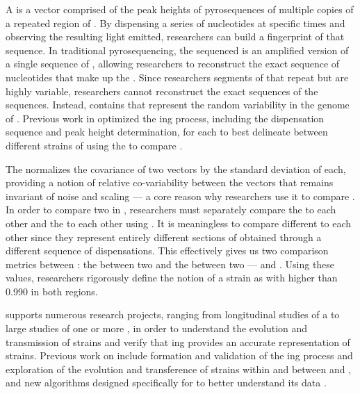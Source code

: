 A \pyro{} is a vector comprised of the peak heights of pyrosequences of multiple copies of a repeated region of \dna{}.
By dispensing a series of nucleotides at specific times and observing the resulting light emitted, \cplop{} researchers can build a fingerprint of that \dna{} sequence.
In traditional pyrosequencing, the \dna{} sequenced is an amplified version of a single sequence of \dna{}, allowing researchers to reconstruct the exact sequence of nucleotides that make up the \dna{}.
Since \cplop{} researchers \pyro{} segments of \dna{} that repeat but are highly variable, researchers cannot reconstruct the exact sequences of the \itsshort{} sequences.
Instead, \cplop{} contains \pyros{} that represent the random variability in the genome of \ecoli{} \isols{}.
Previous work in \cite{Shealy:SeniorProject} optimized the \pyro{}ing process, including the dispensation sequence and peak height determination, for each \itsshort{} to best delineate between different strains of \ecoli{} using the \pearson{} to compare \pyros{}.

The \pearson{} \pcfunclabel{} normalizes the covariance of two vectors by the standard deviation of each, providing a notion of relative co-variability between the vectors that remains invariant of noise and scaling --- a core reason why \cplop{} researchers use it to compare \pyros{}.
In order to compare two \ecoli{} \isols{} in \cplop{}, researchers must separately compare the \Ssixt{} \pyros{} to each other and the \Sfive{} \pyros{} to each other using \pearson{}.
It is meaningless to compare different \itsshort{} to each other since they represent entirely different sections of \dna{} obtained through a different sequence of dispensations.
This effectively gives us two comparison metrics between \isols{}: the \pearson{} between two \Ssixt{} and the \pearson{} \pyros{} between two \Sfive{} \pyros{} --- \pcsixt{} and \pcfive{}.
Using these values, \cplop{} researchers rigorously define the notion of a strain as \isols{} with \pcfunclabel{} higher than 0.990 in both \itsshort{} regions.

\cplop{} supports numerous research projects, ranging from longitudinal studies of a \host{} to large studies of one or more \spec{}, in order to understand the evolution and transmission of \ecoli{} strains and verify that \pyro{}ing provides an accurate representation of \ecoli{} strains.
Previous work on \cplop{} include formation and validation of the \pyro{}ing process and exploration of the evolution and transference of \ecoli{} strains within and between \host{} and \spec{}, and new algorithms designed specifically for \cplop{} to better understand its data \cite{montana2013algorithms, johnson2015density}.

